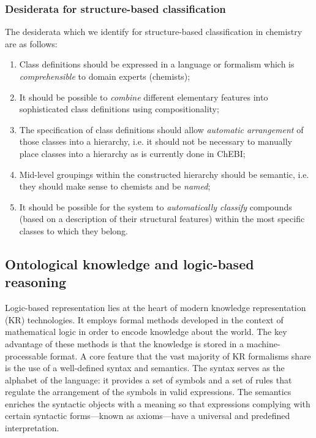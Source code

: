 \documentclass[10pt]{bmc_article}
\newenvironment{bmcformat}{\baselineskip20pt\sloppy\setboolean{publ}{false}}{\baselineskip20pt\sloppy}
\begin{document}
\begin{bmcformat}
\subsubsection*{Desiderata for structure-based classification}
The desiderata which we identify for structure-based classification in chemistry are as follows:
\begin{enumerate}
	\item Class definitions should be expressed in a language or formalism which is \textit{comprehensible} to domain experts (chemists);
  \item It should be possible to \textit{combine} different elementary features into sophisticated class definitions using compositionality;	
	\item The specification of class definitions should allow \textit{automatic arrangement} of those classes into a hierarchy, i.e. it should not be necessary to manually place classes into a hierarchy as is currently done in ChEBI;
	\item Mid-level groupings within the constructed hierarchy should be semantic, i.e. they should make sense to chemists and be \textit{named};
	\item It should be possible for the system to \textit{automatically classify} compounds (based on a description of their structural features) within the most specific classes to which they belong. 
\end{enumerate}


\subsection*{Ontological knowledge and logic-based reasoning}
\label{sec:backlogic}

Logic-based representation lies at the heart of modern knowledge representation (KR) technologies. It employs formal methods developed in the context of mathematical logic in order to encode knowledge about the world. The key advantage of these methods is that the knowledge is stored in a machine-processable format. A core feature that the vast majority of KR formalisms share is the use of a well-defined syntax and semantics. The syntax serves as the alphabet of the language: it provides a set of symbols and a set of rules that regulate the arrangement of the symbols in valid expressions. The semantics enriches the syntactic objects with a meaning so that expressions complying with certain syntactic forms---known as axioms---have a universal and predefined interpretation. 


\end{bmcformat}
\end{document}
